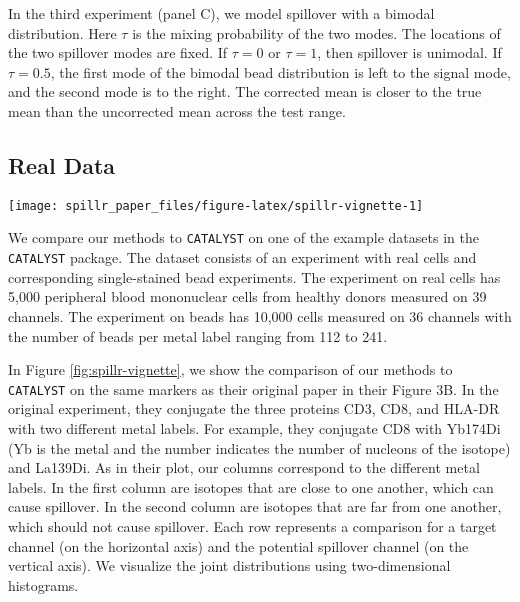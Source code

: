 \documentclass{bioinfo}
\begin{document}
In the third experiment (panel C), we model spillover with a bimodal
distribution. Here \(\tau\) is the mixing probability of the two modes.
The locations of the two spillover modes are fixed. If \(\tau = 0\) or
\(\tau = 1\), then spillover is unimodal. If \(\tau = 0.5\), the first
mode of the bimodal bead distribution is left to the signal mode, and
the second mode is to the right. The corrected mean is closer to the
true mean than the uncorrected mean across the test range.

\subsection{Real Data}

\label{real-data}

\begin{figure*}

{\centering \texttt{[image: spillr\_paper\_files/figure-latex/spillr-vignette-1]} 

}

\caption{Comparison of compensation methods and uncorrected counts on real data. Counts are arcsinh transformed with cofactor of five \citep{bendall2011single}.}\label{fig:spillr-vignette}
\end{figure*}

We compare our methods to \texttt{CATALYST} on one of the example
datasets in the \texttt{CATALYST} package. The dataset consists of an
experiment with real cells and corresponding single-stained bead
experiments. The experiment on real cells has 5,000 peripheral blood
mononuclear cells from healthy donors measured on 39 channels. The
experiment on beads has 10,000 cells measured on 36 channels with the
number of beads per metal label ranging from 112 to 241.

In Figure \ref{fig:spillr-vignette}, we show the comparison of our
methods to \texttt{CATALYST} on the same markers as their original paper
\citep{catalyst} in their Figure 3B. In the original experiment, they
conjugate the three proteins CD3, CD8, and HLA-DR with two different
metal labels. For example, they conjugate CD8 with Yb174Di (Yb is the
metal and the number indicates the number of nucleons of the isotope)
and La139Di. As in their plot, our columns correspond to the different
metal labels. In the first column are isotopes that are close to one
another, which can cause spillover. In the second column are isotopes
that are far from one another, which should not cause spillover. Each
row represents a comparison for a target channel (on the horizontal
axis) and the potential spillover channel (on the vertical axis). We
visualize the joint distributions using two-dimensional histograms.
\end{document}
